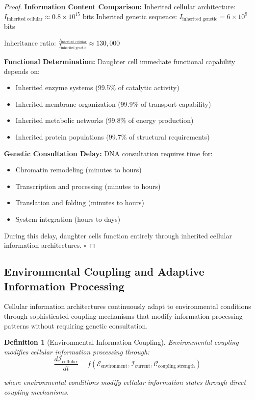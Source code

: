 \documentclass[12pt,a4paper]{article}
\newtheorem{definition}[theorem]{Definition}
\begin{document}
\begin{proof}
\textbf{Information Content Comparison:}
Inherited cellular architecture: $I_{\text{inherited cellular}} \approx 0.8 \times 10^{15}$ bits
Inherited genetic sequence: $I_{\text{inherited genetic}} = 6 \times 10^9$ bits

Inheritance ratio: $\frac{I_{\text{inherited cellular}}}{I_{\text{inherited genetic}}} \approx 130,000$

\textbf{Functional Determination:}
Daughter cell immediate functional capability depends on:
\begin{itemize}
\item Inherited enzyme systems (99.5\% of catalytic activity)
\item Inherited membrane organization (99.9\% of transport capability)  
\item Inherited metabolic networks (99.8\% of energy production)
\item Inherited protein populations (99.7\% of structural requirements)
\end{itemize}

\textbf{Genetic Consultation Delay:}
DNA consultation requires time for:
\begin{itemize}
\item Chromatin remodeling (minutes to hours)
\item Transcription and processing (minutes to hours)
\item Translation and folding (minutes to hours)
\item System integration (hours to days)
\end{itemize}

During this delay, daughter cells function entirely through inherited cellular information architectures. $\square$
\end{proof}

\subsection{Environmental Coupling and Adaptive Information Processing}

Cellular information architectures continuously adapt to environmental conditions through sophisticated coupling mechanisms that modify information processing patterns without requiring genetic consultation.

\begin{definition}[Environmental Information Coupling]
Environmental coupling modifies cellular information processing through:
$$\frac{d\mathcal{I}_{\text{cellular}}}{dt} = f(\mathcal{E}_{\text{environment}}, \mathcal{I}_{\text{current}}, \mathcal{C}_{\text{coupling strength}})$$

where environmental conditions modify cellular information states through direct coupling mechanisms.
\end{definition}
\end{document}

